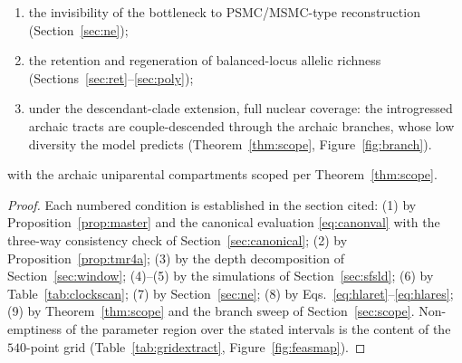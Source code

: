 \begin{theorem}
\begin{enumerate}
\item the invisibility of the bottleneck to PSMC/MSMC-type reconstruction
(Section~\ref{sec:ne});
\item the retention and regeneration of balanced-locus allelic richness
(Sections~\ref{sec:ret}--\ref{sec:poly});
\item under the descendant-clade extension, full nuclear coverage: the
introgressed archaic tracts are couple-descended through the archaic
branches, whose low diversity the model predicts (Theorem~\ref{thm:scope},
Figure~\ref{fig:branch}).
\end{enumerate}
with the archaic uniparental compartments scoped per
Theorem~\ref{thm:scope}.
\end{theorem}

\begin{proof}
Each numbered condition is established in the section cited: (1) by
Proposition~\ref{prop:master} and the canonical evaluation
\eqref{eq:canonval} with the three-way consistency check of
Section~\ref{sec:canonical}; (2) by Proposition~\ref{prop:tmr4a};
(3) by the depth decomposition of Section~\ref{sec:window}; (4)--(5) by
the simulations of Section~\ref{sec:sfsld}; (6) by Table~\ref{tab:clockscan};
(7) by Section~\ref{sec:ne}; (8) by Eqs.~\eqref{eq:hlaret}--\eqref{eq:hlares};
(9) by Theorem~\ref{thm:scope} and the branch sweep of
Section~\ref{sec:scope}.
Non-emptiness of the parameter region over the stated intervals is the
content of the $540$-point grid (Table~\ref{tab:gridextract},
Figure~\ref{fig:feasmap}).
\end{proof}


